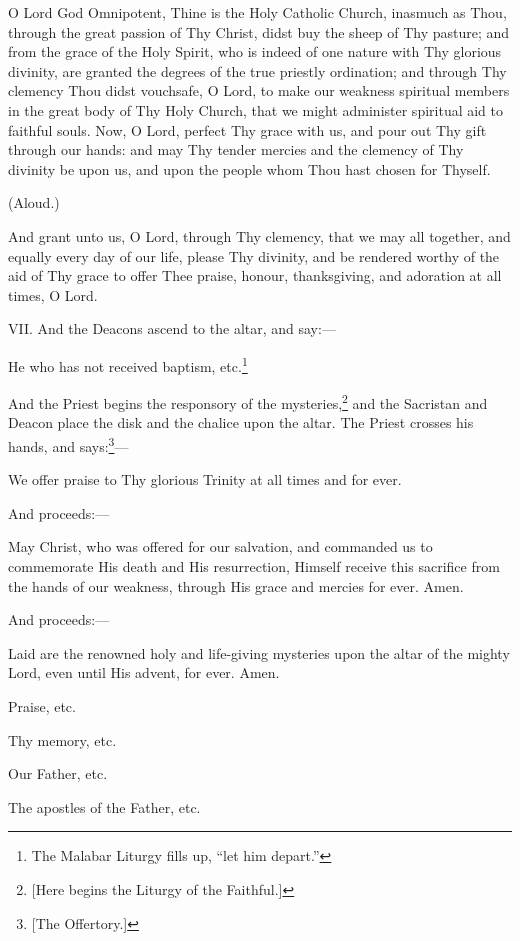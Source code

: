 O Lord God Omnipotent, Thine is the Holy Catholic Church, inasmuch as Thou, through the great passion of Thy Christ, didst buy the sheep of Thy pasture; and from the grace of the Holy Spirit, who is indeed of one nature with Thy glorious divinity, are granted the degrees of the true priestly ordination; and through Thy clemency Thou didst vouchsafe, O Lord, to make our weakness spiritual members in the great body of Thy Holy Church, that we might administer spiritual aid to faithful souls. Now, O Lord, perfect Thy grace with us, and pour out Thy gift through our hands: and may Thy tender mercies and the clemency of Thy divinity be upon us, and upon the people whom Thou hast chosen for Thyself.

(Aloud.)

And grant unto us, O Lord, through Thy clemency, that we may all together, and equally every day of our life, please Thy divinity, and be rendered worthy of the aid of Thy grace to offer Thee praise, honour, thanksgiving, and adoration at all times, O Lord.

VII. And the Deacons ascend to the altar, and say:—

He who has not received baptism, etc.\footnote{\par  The Malabar Liturgy fills up, “let him depart.”}

And the Priest begins the responsory of the mysteries,\footnote{\par{}  [Here begins the Liturgy of the Faithful.]} and the Sacristan and Deacon place the disk and the chalice upon the altar. The Priest crosses his hands, and says:\footnote{\par{}  [The Offertory.]}—

We offer praise to Thy glorious Trinity at all times and for ever.

And proceeds:—

May Christ, who was offered for our salvation, and commanded us to commemorate His death and His resurrection, Himself receive this sacrifice from the hands of our weakness, through His grace and mercies for ever. Amen.

And proceeds:—

Laid are the renowned holy and life-giving mysteries upon the altar of the mighty Lord, even until His advent, for ever. Amen.

Praise, etc.

Thy memory, etc.

Our Father, etc.

The apostles of the Father, etc.

